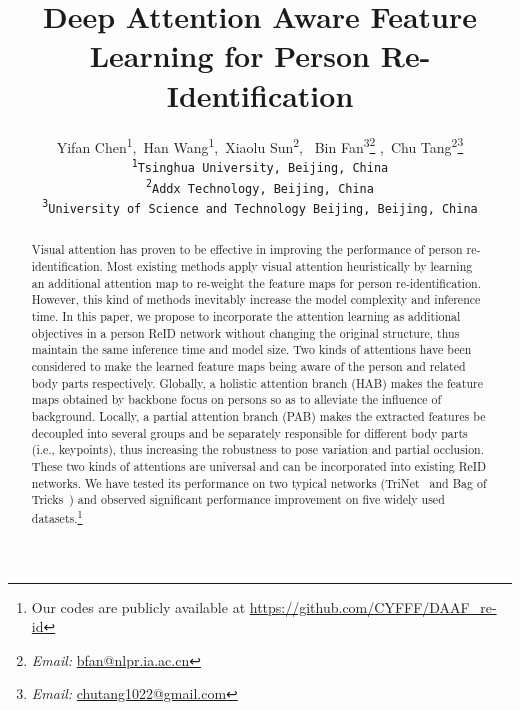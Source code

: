 \documentclass[10pt,twocolumn,letterpaper]{article}
\begin{document}
\title{Deep Attention Aware Feature Learning for Person Re-Identification}

\author{Yifan Chen\textsuperscript{1},\ Han Wang\textsuperscript{1},\ Xiaolu Sun\textsuperscript{2}, \ Bin Fan\textsuperscript{3}\thanks{\textit{Email:} \url{bfan@nlpr.ia.ac.cn}} ,\ Chu Tang\textsuperscript{2}\thanks{\textit{Email:} \url{chutang1022@gmail.com}} \\
	\tt\small{\textsuperscript{1}Tsinghua University, Beijing, China}  \\
	 \tt\small{\textsuperscript{2}Addx Technology, Beijing, China} \\
	 \tt\small{\textsuperscript{3}University of Science and Technology Beijing, Beijing, China}\\
}

\maketitle


\begin{abstract}
	Visual attention has proven to be effective in improving the performance of person re-identification. Most existing methods apply visual attention heuristically by learning an additional attention map to re-weight the feature maps for person re-identification. However, this kind of methods inevitably increase the model complexity and inference time. In this paper, we propose to incorporate the attention learning as additional objectives in a person ReID network without changing the original structure, thus maintain the same inference time and model size. Two kinds of attentions have been considered to make the learned feature maps being aware of the person and related body parts respectively. Globally, a holistic attention branch (HAB) makes the feature maps obtained by backbone focus on persons so as to alleviate the influence of background. Locally, a partial attention branch (PAB) makes the extracted features be decoupled into several groups and be separately responsible for different body parts (i.e., keypoints), thus increasing the robustness to pose variation and partial occlusion. These two kinds of attentions are universal and can be incorporated into existing ReID networks. We have tested its performance on two typical networks (TriNet~\cite{hermans2017defense} and Bag of Tricks~\cite{luo2019bag}) and observed significant performance improvement on five widely used datasets.\footnote{Our codes are publicly available at \url{https://github.com/CYFFF/DAAF_re-id}}
\end{abstract}
\end{document}

